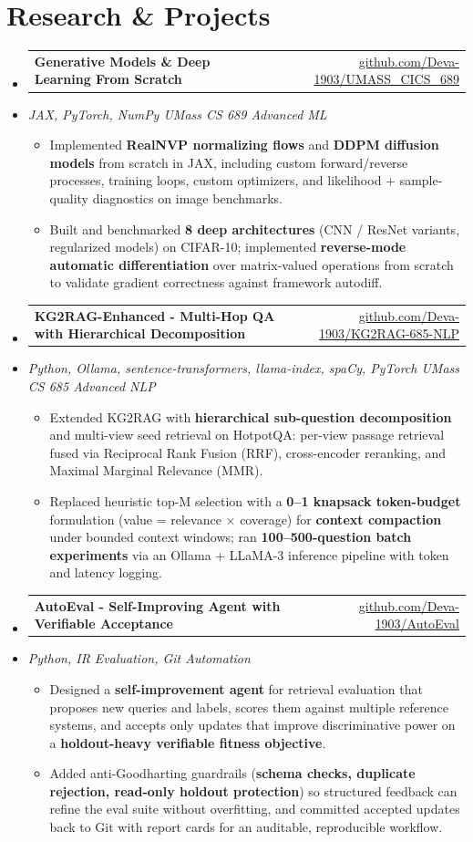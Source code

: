 \documentclass[letterpaper,10pt]{article}
\makeatletter
\newcommand{\resumeItem}[1]{
  \item\small{#1\vspace{-1pt}}
}
\newcommand{\resumeProjectHeading}[2]{
    \item
    \begin{tabular*}{0.985\textwidth}[t]{l@{\extracolsep{\fill}}r}
      \small\textbf{#1} & \small #2 \\
    \end{tabular*}\vspace{-5pt}
}
\newcommand{\resumeProjectSubheading}[1]{
  \vspace{-2pt}\item[] {\small\textcolor{ResumeSlate}{\emph{#1}}}\vspace{-3pt}
}
\newcommand{\resumeSubHeadingListStart}{\begin{itemize}[leftmargin=0.0in, label={}, itemsep=2pt, topsep=2pt]}
\newcommand{\resumeSubHeadingListEnd}{\end{itemize}}
\newcommand{\resumeItemListStart}{\begin{itemize}[leftmargin=0.18in, itemsep=2pt, topsep=1pt]}
\newcommand{\resumeItemListEnd}{\end{itemize}\vspace{-4pt}}
\makeatother
\begin{document}
\section{Research \& Projects}
\resumeSubHeadingListStart
  \resumeProjectHeading
    {Generative Models \& Deep Learning From Scratch}
    {\href{https://github.com/Deva-1903/UMASS_CICS_689}{github.com/Deva-1903/UMASS\_CICS\_689}}
  \resumeProjectSubheading{JAX, PyTorch, NumPy \enspace\textbar\enspace UMass CS 689 Advanced ML}
    \resumeItemListStart
      \resumeItem{Implemented \textbf{RealNVP normalizing flows} and \textbf{DDPM diffusion models} from scratch in JAX, including custom forward/reverse processes, training loops, custom optimizers, and likelihood + sample-quality diagnostics on image benchmarks.}
      \resumeItem{Built and benchmarked \textbf{8 deep architectures} (CNN / ResNet variants, regularized models) on CIFAR-10; implemented \textbf{reverse-mode automatic differentiation} over matrix-valued operations from scratch to validate gradient correctness against framework autodiff.}
    \resumeItemListEnd
  \resumeProjectHeading
    {KG2RAG-Enhanced - Multi-Hop QA with Hierarchical Decomposition}
    {\href{https://github.com/Deva-1903/KG2RAG-685-NLP}{github.com/Deva-1903/KG2RAG-685-NLP}}
  \resumeProjectSubheading{Python, Ollama, sentence-transformers, llama-index, spaCy, PyTorch \enspace\textbar\enspace UMass CS 685 Advanced NLP}
    \resumeItemListStart
      \resumeItem{Extended KG2RAG with \textbf{hierarchical sub-question decomposition} and multi-view seed retrieval on HotpotQA: per-view passage retrieval fused via Reciprocal Rank Fusion (RRF), cross-encoder reranking, and Maximal Marginal Relevance (MMR).}
      \resumeItem{Replaced heuristic top-M selection with a \textbf{0--1 knapsack token-budget} formulation (value = relevance \(\times\) coverage) for \textbf{context compaction} under bounded context windows; ran \textbf{100--500-question batch experiments} via an Ollama + LLaMA-3 inference pipeline with token and latency logging.}
    \resumeItemListEnd
  \resumeProjectHeading
    {AutoEval - Self-Improving Agent with Verifiable Acceptance}
    {\href{https://github.com/Deva-1903/AutoEval}{github.com/Deva-1903/AutoEval}}
  \resumeProjectSubheading{Python, IR Evaluation, Git Automation}
    \resumeItemListStart
      \resumeItem{Designed a \textbf{self-improvement agent} for retrieval evaluation that proposes new queries and labels, scores them against multiple reference systems, and accepts only updates that improve discriminative power on a \textbf{holdout-heavy verifiable fitness objective}.}
      \resumeItem{Added anti-Goodharting guardrails (\textbf{schema checks, duplicate rejection, read-only holdout protection}) so structured feedback can refine the eval suite without overfitting, and committed accepted updates back to Git with report cards for an auditable, reproducible workflow.}
    \resumeItemListEnd
\resumeSubHeadingListEnd
\vspace{-4pt}
\end{document}
